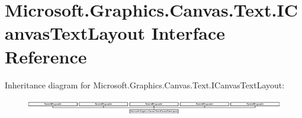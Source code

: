 \hypertarget{interface_microsoft_1_1_graphics_1_1_canvas_1_1_text_1_1_i_canvas_text_layout}{}\section{Microsoft.\+Graphics.\+Canvas.\+Text.\+I\+Canvas\+Text\+Layout Interface Reference}
\label{interface_microsoft_1_1_graphics_1_1_canvas_1_1_text_1_1_i_canvas_text_layout}
Inheritance diagram for Microsoft.\+Graphics.\+Canvas.\+Text.\+I\+Canvas\+Text\+Layout\+:\begin{figure}[H]
\begin{center}
\leavevmode
\includegraphics[height=0.715655cm]{interface_microsoft_1_1_graphics_1_1_canvas_1_1_text_1_1_i_canvas_text_layout}
\end{center}
\end{figure}
